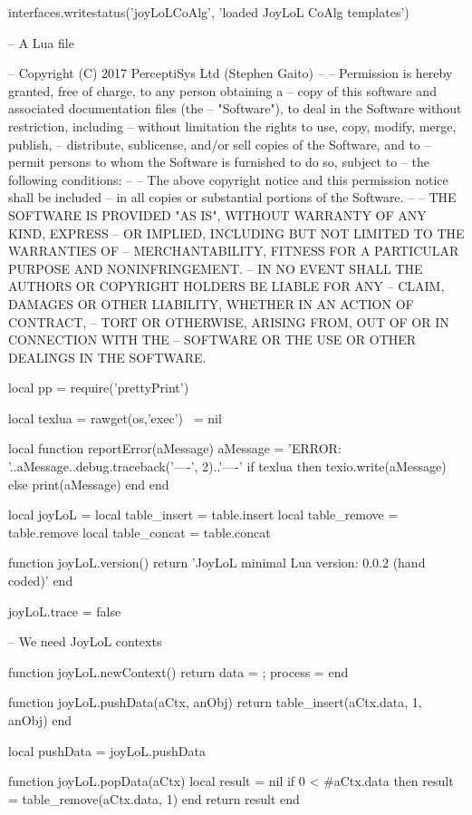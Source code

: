 interfaces.writestatus('joyLoLCoAlg', 'loaded JoyLoL CoAlg templates')
\stopLuaTemplate

\startMinJoyLoL
-- A Lua file

-- Copyright (C) 2017 PerceptiSys Ltd (Stephen Gaito)
--
-- Permission is hereby granted, free of charge, to any person obtaining a 
-- copy of this software and associated documentation files (the 
-- "Software"), to deal in the Software without restriction, including 
-- without limitation the rights to use, copy, modify, merge, publish, 
-- distribute, sublicense, and/or sell copies of the Software, and to 
-- permit persons to whom the Software is furnished to do so, subject to 
-- the following conditions:
--
-- The above copyright notice and this permission notice shall be included 
-- in all copies or substantial portions of the Software.
--
-- THE SOFTWARE IS PROVIDED "AS IS", WITHOUT WARRANTY OF ANY KIND, EXPRESS 
-- OR IMPLIED, INCLUDING BUT NOT LIMITED TO THE WARRANTIES OF 
-- MERCHANTABILITY, FITNESS FOR A PARTICULAR PURPOSE AND NONINFRINGEMENT. 
-- IN NO EVENT SHALL THE AUTHORS OR COPYRIGHT HOLDERS BE LIABLE FOR ANY 
-- CLAIM, DAMAGES OR OTHER LIABILITY, WHETHER IN AN ACTION OF CONTRACT, 
-- TORT OR OTHERWISE, ARISING FROM, OUT OF OR IN CONNECTION WITH THE 
-- SOFTWARE OR THE USE OR OTHER DEALINGS IN THE SOFTWARE.

local pp = require('prettyPrint')

local texlua = rawget(os,'exec')    ~= nil

local function reportError(aMessage)
  aMessage = 'ERROR: '..aMessage..debug.traceback('\n----', 2)..'\n----\n'
  if texlua then
    texio.write(aMessage)
  else
    print(aMessage)
  end
end

local joyLoL = { }
local table_insert = table.insert
local table_remove = table.remove
local table_concat = table.concat

function joyLoL.version()
  return 'JoyLoL minimal Lua version: 0.0.2 (hand coded)'
end

joyLoL.trace = false

-- We need JoyLoL contexts

function joyLoL.newContext()
  return { data = { }; process = { } }
end

function joyLoL.pushData(aCtx, anObj)
  return table_insert(aCtx.data, 1, anObj)
end

local pushData = joyLoL.pushData

function joyLoL.popData(aCtx)
  local result = nil
  if 0 < #aCtx.data then
    result = table_remove(aCtx.data, 1)
  end
  return result
end


